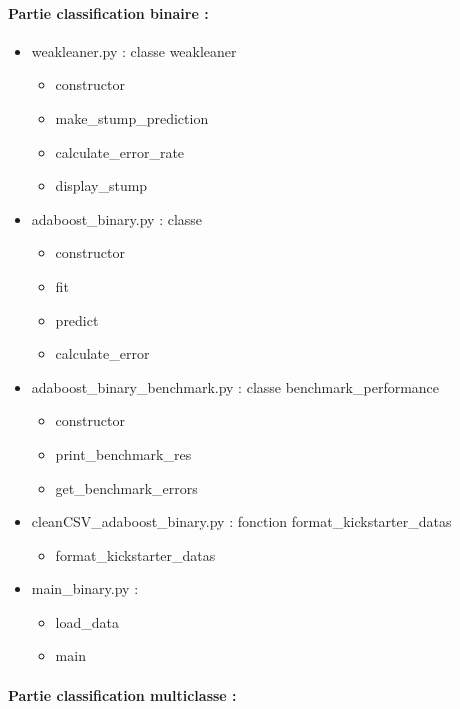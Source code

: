 \documentclass{article}
\begin{document}
\paragraph{Partie classification binaire : }
\begin{itemize}
  \item weakleaner.py : classe weakleaner
  \begin{itemize}
    \item constructor
    \item make\_stump\_prediction
    \item calculate\_error\_rate
    \item display\_stump
  \end{itemize}
  \item adaboost\_binary.py : classe 
  \begin{itemize}
          \item constructor
            \item fit
            \item predict
            \item calculate\_error
    \end{itemize}
  \item adaboost\_binary\_benchmark.py : classe benchmark\_performance
  \begin{itemize}
          \item constructor
          \item print\_benchmark\_res
          \item get\_benchmark\_errors
    \end{itemize}
  \item cleanCSV\_adaboost\_binary.py : fonction format\_kickstarter\_datas
  \begin{itemize}
            \item format\_kickstarter\_datas
    \end{itemize}
  \item main\_binary.py :
  \begin{itemize}
          \item load\_data
          \item main
    \end{itemize}

\end{itemize}

\paragraph{Partie classification multiclasse : }
\end{document}
